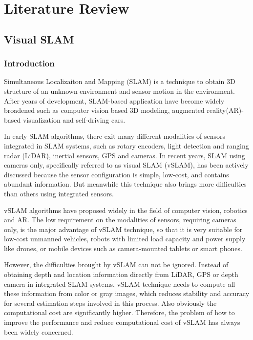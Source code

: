 
\chapter{Literature Review}

\section{Visual SLAM}

\subsection{Introduction}
Simultaneous Localizaiton and Mapping (SLAM) is a technique to obtain 3D structure of an unknown environment and sensor motion in the environment. After years of development, SLAM-based application have become widely broadened such as computer vision based 3D modeling, augmented reality(AR)-based visualization and self-driving cars. 

In early SLAM algorithms, there exit many different modalities of sensors integrated in SLAM systems, such as rotary encoders, light detection and ranging radar (LiDAR), inertial sensors, GPS and cameras. In recent years, SLAM using cameras only,  specifically referred to as visual SLAM (vSLAM), has been actively discussed because the sensor configuration is simple, low-cost, and contains abundant information. But meanwhile this technique also brings more difficulties than others using integrated sensors\cite{taketomi2017visual}. 

vSLAM algorithms have proposed widely in the field of computer vision, robotics and AR. The low requirement on the modalities of sensors, requiring cameras only, is the major advantage of vSLAM technique, so that it is very suitable for low-cost unmanned vehicles, robots with limited load capacity and power supply like drones, or mobile devices such as camera-mounted tablets or smart phones.

However, the difficulties brought by vSLAM can not be ignored. Instead of obtaining depth and location information directly from LiDAR, GPS or depth camera in integrated SLAM systems, vSLAM technique needs to compute all these information from color or gray images, which reduces stability and accuracy for several estimation steps involved in this process. Also obviously the computational cost are significantly higher. Therefore, the problem of how to improve the performance and reduce computational cost of vSLAM has always been widely concerned.

